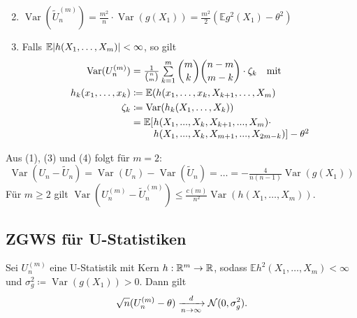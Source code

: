 \documentclass{cheat-sheet}
\newcommand{\E}{\mathbb{E}} %
\DeclareMathOperator{\var}{Var} %
\newcommand{\Normal}{\mathcal{N}} %
\begin{document}
\begin{lem}
  \begin{enumerate}[label=(\arabic*), itemindent=6pt]
    \setcounter{enumi}{1}
    \item $\var(\tilde{U}^{(m)}_n) = \tfrac{m^2}{n} \cdot \var(g(X_1)) = \tfrac{m^2}{2} ( \E g^2(X_1) - \theta^2 )$
    \item Falls $\E \abs{h(X_1, \ldots, X_m)} < \infty$, so gilt
    \begin{align*}
      \var(U_n^{(m)}) & = \tfrac{1}{\binom{n}{m}} \sum_{k=1}^m \binom{m}{k} \binom{n - m}{m - k} \cdot \zeta_k \quad \text{mit} \\
      h_k(x_1, \ldots, x_k) & \coloneqq \E(h(x_1, \ldots, x_k, X_{k+1}, \ldots, X_m) \\
      \zeta_k & \coloneqq \var(h_k(X_1, \ldots, X_k)) \\
      & =
      \arraycolsep=0.2pt
      \begin{array}[t]{l l}
        \E[ & h(X_1, \nldots, X_k, X_{k+1}, \nldots, X_m) \cdot \\
        & h(X_1, \nldots, X_k, X_{m+1}, \nldots, X_{2m-k})] - \theta^2
      \end{array}
    \end{align*}
  \end{enumerate}
\end{lem}

\begin{kor}
  Aus (1), (3) und (4) folgt für $m=2$:
  \[
    \var(U_n - \tilde{U}_n)
    = \var(U_n) - \var(\tilde{U}_n)
    = \ldots
    = - \tfrac{4}{n (n-1)} \var(g(X_1))
  \]
  Für $m \geq 2$ gilt $\var(U_n^{(m)} - \tilde{U}_n^{(m)}) \leq \tfrac{c(m)}{n^2} \var(h(X_1, \ldots, X_m))$.
\end{kor}


\subsection{ZGWS für U-Statistiken}

\begin{satz}
  Sei $U_n^{(m)}$ eine U-Statistik mit Kern $h : \mathbb{R}^m \to \mathbb{R}$, sodass $\E h^2(X_1, \ldots, X_m) < \infty$ und $\sigma_g^2 \coloneqq \var(g(X_1)) > 0$.
  Dann gilt
  \[ \sqrt{n} (U_n^{(m)} - \theta) \xra[n \to \infty]{d} \Normal(0, \sigma_g^2). \]
\end{satz}
\end{document}
